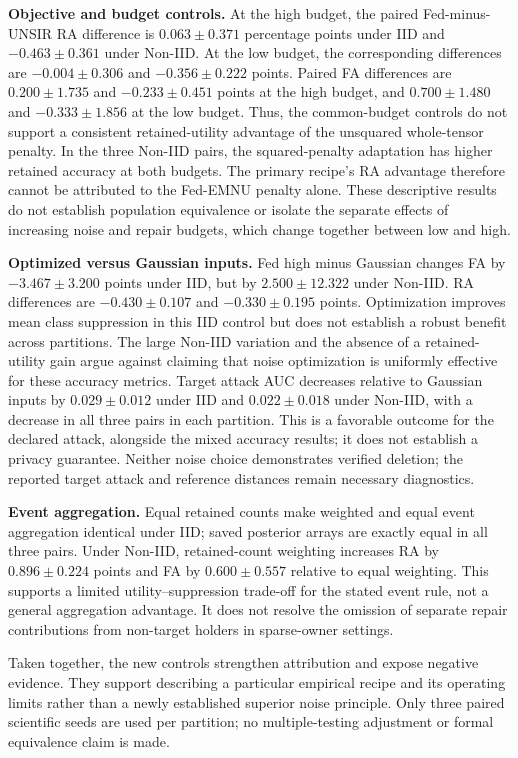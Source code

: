 \textbf{Objective and budget controls.} At the high budget, the paired
Fed-minus-UNSIR RA difference is $0.063\pm0.371$ percentage points under IID
and $-0.463\pm0.361$ under Non-IID. At the low budget, the corresponding
differences are $-0.004\pm0.306$ and $-0.356\pm0.222$ points. Paired FA
differences are $0.200\pm1.735$ and $-0.233\pm0.451$ points at the high
budget, and $0.700\pm1.480$ and $-0.333\pm1.856$ at the low budget.
Thus, the common-budget controls do not support a consistent retained-utility
advantage of the unsquared whole-tensor penalty. In the three Non-IID pairs,
the squared-penalty adaptation has higher retained accuracy at both budgets.
The primary recipe's RA advantage therefore cannot be attributed to the
Fed-EMNU penalty alone. These descriptive results do not establish population
equivalence or isolate the separate effects of increasing noise and repair
budgets, which change together between low and high.

\textbf{Optimized versus Gaussian inputs.} Fed high minus Gaussian changes
FA by $-3.467\pm3.200$ points under IID, but by $2.500\pm12.322$ under
Non-IID. RA differences are $-0.430\pm0.107$ and $-0.330\pm0.195$ points.
Optimization improves mean class suppression in this IID control but does
not establish a robust benefit across partitions. The large Non-IID variation
and the absence of a retained-utility gain argue against claiming that noise
optimization is uniformly effective for these accuracy metrics. Target attack
AUC decreases relative to Gaussian inputs by $0.029\pm0.012$ under IID and
$0.022\pm0.018$ under Non-IID, with a decrease in all three pairs in each
partition. This is a favorable outcome for the declared attack, alongside the
mixed accuracy results; it does not establish a privacy guarantee. Neither noise choice demonstrates
verified deletion; the reported target attack and reference distances remain
necessary diagnostics.

\textbf{Event aggregation.} Equal retained counts make weighted and equal
event aggregation identical under IID; saved posterior arrays are exactly
equal in all three pairs. Under Non-IID, retained-count weighting increases
RA by $0.896\pm0.224$ points and FA by $0.600\pm0.557$ relative to equal
weighting. This supports a limited utility--suppression trade-off for the
stated event rule, not a general aggregation advantage. It does not resolve
the omission of separate repair contributions from non-target holders in
sparse-owner settings.

Taken together, the new controls strengthen attribution and expose negative
evidence. They support describing a particular empirical recipe and its
operating limits rather than a newly established superior noise principle.
Only three paired scientific seeds are used per partition; no multiple-testing
adjustment or formal equivalence claim is made.
